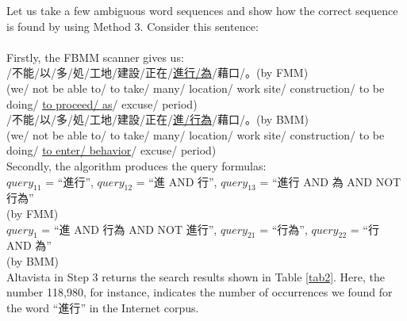 {Let us take a few ambiguous word sequences and show how the correct sequence is found by using Method 3. Consider this sentence:\\
\hspace*{4zw}{\small 我們不能以多処工地建設正在進行為藉口。}\\
Firstly, the FBMM scanner gives us:\\
\hspace*{4zw}{\small 我們}/{\small 不能}/{\small 以}/{\small 多}/{\small 処}/{\small 工地}/{\small 建設}/{\small 正在}/\underline{{\small 進行}/{\small 為}}/{\small 藉口}/{\small 。}(by FMM)\\
\hspace*{4zw}(we/ not be able to/ to take/ many/ location/ work site/ construction/ to be\\
\hspace*{4zw}doing/ \underline{to proceed/ as}/ excuse/ period)\\
\hspace*{4zw}{\small 我們}/{\small 不能}/{\small 以}/{\small 多}/{\small 処}/{\small 工地}/{\small 建設}/{\small 正在}/\underline{{\small 進}/{\small 行為}}/{\small 藉口}/{\small 。}(by BMM)\\
\hspace*{4zw}(we/ not be able to/ to take/ many/ location/ work site/ construction/ to be\\
\hspace*{4zw}doing/ \underline{to enter/ behavior}/ excuse/ period)\\
Secondly, the algorithm produces the query formulas: \\
\hspace*{1zw}${query}_{11}$ = ``{\small 進行}'', ${query}_{12}$ = ``{\small 進} AND {\small 行}'', ${query}_{13}$ = ``{\small 進行} AND {\small 為} AND NOT {\small 行為}''\\
\hspace*{2zw}(by FMM)\\
\hspace*{1zw}${query}_{1}$ = ``{\small 進} AND {\small 行為} AND NOT {\small 進行}'', ${query}_{21}$ = ``{\small 行為}'', ${query}_{22}$ = ``{\small 行} AND {\small 為}''\\
\hspace*{2zw}(by BMM)\\
Altavista in Step 3 returns the search results shown in Table \ref{tab2}. Here, the number 118,980, for instance, indicates the number of occurrences we found for the word ``{\small 進行}'' in the Internet corpus.

}
